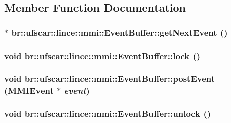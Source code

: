 \subsection{Member Function Documentation}
\hypertarget{classbr_1_1ufscar_1_1lince_1_1mmi_1_1EventBuffer_a9e497a0f2baf03f32c0df8222a4e5f90}{
\subsubsection[{getNextEvent}]{$\ast$ br::ufscar::lince::mmi::EventBuffer::getNextEvent ()}}
\label{classbr_1_1ufscar_1_1lince_1_1mmi_1_1EventBuffer_a9e497a0f2baf03f32c0df8222a4e5f90}
\hypertarget{classbr_1_1ufscar_1_1lince_1_1mmi_1_1EventBuffer_af7ee2f11f7e65ab0394040f579132596}{
\subsubsection[{lock}]{\setlength{\rightskip}{0pt plus 5cm}void br::ufscar::lince::mmi::EventBuffer::lock ()}}
\label{classbr_1_1ufscar_1_1lince_1_1mmi_1_1EventBuffer_af7ee2f11f7e65ab0394040f579132596}
\hypertarget{classbr_1_1ufscar_1_1lince_1_1mmi_1_1EventBuffer_a082c7953dc3c98ce8304ce27e8c7a8fc}{
\subsubsection[{postEvent}]{\setlength{\rightskip}{0pt plus 5cm}void br::ufscar::lince::mmi::EventBuffer::postEvent ({\bf MMIEvent} $\ast$ {\em event})}}
\label{classbr_1_1ufscar_1_1lince_1_1mmi_1_1EventBuffer_a082c7953dc3c98ce8304ce27e8c7a8fc}
\hypertarget{classbr_1_1ufscar_1_1lince_1_1mmi_1_1EventBuffer_a3b3a81b43ed99f201d6b70246dc83587}{
\subsubsection[{unlock}]{\setlength{\rightskip}{0pt plus 5cm}void br::ufscar::lince::mmi::EventBuffer::unlock ()}}
